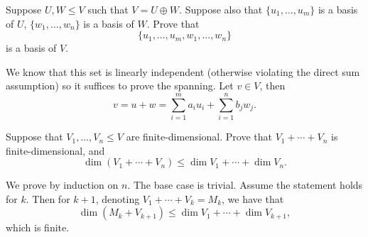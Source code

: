 \begin{exercise}
Suppose $U,W\le V$ such that $V=U\oplus W$. Suppose also that $\{u_1,\dots,u_m\}$ is a basis of $U$, $\{w_1,\dots,w_n\}$ is a basis of $W$. Prove that
\[\{u_1,\dots,u_m,w_1,\dots,w_n\}\]
is a basis of $V$.
\end{exercise}

\begin{solution}
We know that this set is linearly independent (otherwise violating the direct sum assumption) so it suffices to prove the spanning. Let $v\in V$, then
\[v=u+w=\sum_{i=1}^{m}a_iu_i+\sum_{i=1}^{n}b_jw_j.\]
\end{solution}

\begin{exercise}

\end{exercise}

\begin{exercise}

\end{exercise}

\begin{exercise}
Suppose that $V_1,\dots,V_n\le V$ are finite-dimensional. Prove that $V_1+\cdots+V_n$ is finite-dimensional, and
\[\dim(V_1+\cdots+V_n)\le\dim V_1+\cdots+\dim V_n.\]
\end{exercise}

\begin{solution}
We prove by induction on $n$. The base case is trivial. Assume the statement holds for $k$. Then for $k+1$, denoting $V_1+\cdots+V_k=M_k$, we have that
\[\dim(M_k+V_{k+1})\le\dim V_1+\cdots+\dim V_{k+1},\]
which is finite.
\end{solution}